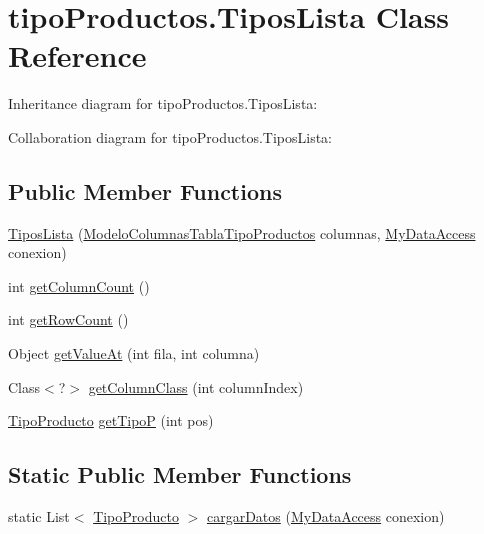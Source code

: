 \hypertarget{classtipo_productos_1_1_tipos_lista}{}\section{tipo\+Productos.\+Tipos\+Lista Class Reference}
\label{classtipo_productos_1_1_tipos_lista}


Inheritance diagram for tipo\+Productos.\+Tipos\+Lista\+:


Collaboration diagram for tipo\+Productos.\+Tipos\+Lista\+:
\subsection*{Public Member Functions}
\begin{DoxyCompactItemize}
\item 
\mbox{\hyperlink{classtipo_productos_1_1_tipos_lista_a75e4a1ac3bcb6d64c3fc5dbae72e85c5}{Tipos\+Lista}} (\mbox{\hyperlink{classtipo_productos_1_1_modelo_columnas_tabla_tipo_productos}{Modelo\+Columnas\+Tabla\+Tipo\+Productos}} columnas, \mbox{\hyperlink{classconexion_s_q_l_1_1_my_data_access}{My\+Data\+Access}} conexion)
\item 
int \mbox{\hyperlink{classtipo_productos_1_1_tipos_lista_ae09ef2d57d7c7989d4e0e99463294761}{get\+Column\+Count}} ()
\item 
int \mbox{\hyperlink{classtipo_productos_1_1_tipos_lista_a619180cf0e73dd687d83511c805b0a7d}{get\+Row\+Count}} ()
\item 
Object \mbox{\hyperlink{classtipo_productos_1_1_tipos_lista_a78deb10c0cd2fbc2dfa0de19054e033e}{get\+Value\+At}} (int fila, int columna)
\item 
Class$<$?$>$ \mbox{\hyperlink{classtipo_productos_1_1_tipos_lista_a87b924c7d8f72e7615286c41d19c2589}{get\+Column\+Class}} (int column\+Index)
\item 
\mbox{\hyperlink{classtipo_productos_1_1_tipo_producto}{Tipo\+Producto}} \mbox{\hyperlink{classtipo_productos_1_1_tipos_lista_a825bd94b7e40672ab7d3a84083c21245}{get\+TipoP}} (int pos)
\end{DoxyCompactItemize}
\subsection*{Static Public Member Functions}
\begin{DoxyCompactItemize}
\item 
static List$<$ \mbox{\hyperlink{classtipo_productos_1_1_tipo_producto}{Tipo\+Producto}} $>$ \mbox{\hyperlink{classtipo_productos_1_1_tipos_lista_ad36441dd4c32340b0905b5d30b91fcb4}{cargar\+Datos}} (\mbox{\hyperlink{classconexion_s_q_l_1_1_my_data_access}{My\+Data\+Access}} conexion)
\end{DoxyCompactItemize}



